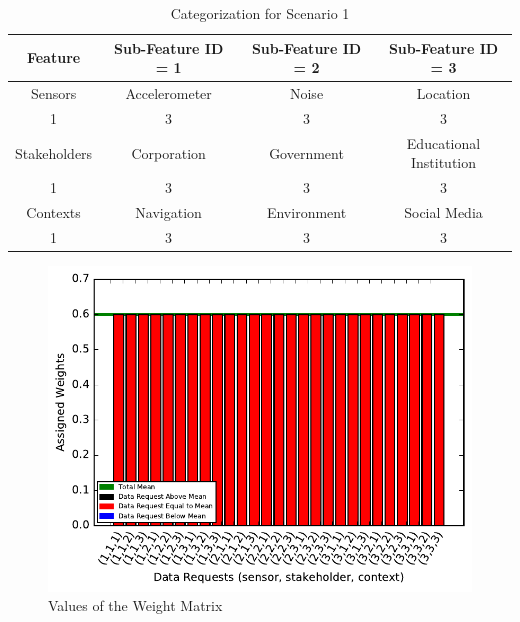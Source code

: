 \begin{table}[h!]
  \centering
  \caption{Categorization for Scenario 1}
  \label{tab:scenario11}
  \begin{tabular}{cccc}
    \toprule
    Feature & Sub-Feature ID = 1 & Sub-Feature ID = 2 & Sub-Feature ID = 3\\
    \midrule
    Sensors & Accelerometer & Noise & Location\\
     1 & 3 & 3 & 3\\ \hhline{====}
     Stakeholders & Corporation & Government & Educational Institution\\
     1 & 3 & 3 & 3\\ \hhline{====}
     Contexts & Navigation & Environment & Social Media\\
     1 & 3 & 3 & 3\\ 
    \bottomrule
  \end{tabular}
\end{table}
 

\begin{figure}[ht!]
\centering
\includegraphics[width=\textwidth,keepaspectratio]{./images/weight_1_1}
\caption{Values of the Weight Matrix \label{weight11}}
\end{figure}


